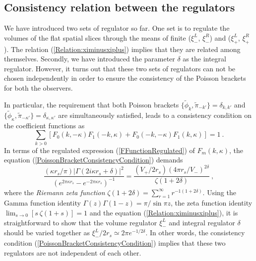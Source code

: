 \documentclass[aps,twocolumn,showpacs]{revtex4}
\def\kr{\kappa}
\def\rs{r_s}
\begin{document}
\subsection{Consistency relation between the regulators}          

We have introduced two sets of regulator so far. One set is to regulate the 
volumes of the flat spatial slices through the means of finite ($\xi_{-}^L$, 
$\xi_{-}^R$) and ($\xi_{+}^L$, $\xi_{+}^R$). The relation 
(\ref{Relation:ximinusxiplus}) implies that they are related among 
themselves. Secondly, we have introduced the parameter $\delta$ as the integral 
regulator. However, it turns out that these two sets of regulators can not be 
chosen independently in order to ensure the consistency of the Poisson brackets 
for both the observers. 
        

In particular, the requirement that both Poisson brackets 
$\{\tilde{\phi}_{k},\tilde{\pi}_{-k'}\} = \delta_{k,k'}$ and
$\{\tilde{\phi}_{\kr},\tilde{\pi}_{-\kr'}\} = \delta_{\kr,\kr'}$
are simultaneously satisfied, leads to a consistency condition on the
coefficient functions as
%
\begin{equation}\label{PoissonBracketConsistencyCondition}
\sum_{k>0} \left[ F_{0}(k,-\kr)F_{1}(-k,\kr) 
+ F_{0}(-k,-\kr)F_{1}(k,\kr) \right] = 1 ~.
\end{equation}
%
In terms of the regulated expression (\ref{FFunctionRegulated}) of 
$F_{m}(k,\kr)$, the  equation (\ref{PoissonBracketConsistencyCondition}) demands
%
\begin{equation}\label{PoissonBracketConsistencyCondition2}
\frac{(\kr\rs/\pi) |\Gamma(2i\kr\rs + \delta)|^2}
{(e^{2\pi\kr\rs}-e^{-2\pi\kr\rs})^{-1}}
= \frac{(V_{+}/2\rs) (4\pi\rs/V_{-})^{2\delta} }{\zeta(1+2\delta)} ~,
\end{equation}
%
where the \emph{Riemann zeta function} $\zeta(1+2\delta) = \sum_{r=1}^{\infty} 
r^{-1(1+2\delta)}$. Using the Gamma function identity 
$\Gamma(z)\Gamma(1-z) = \pi/\sin\pi z$, the zeta function identity 
$\lim_{s\to0}[s~ \zeta(1+s)] = 1$ and the equation 
(\ref{Relation:ximinusxiplus}), it is straightforward to show that 
the volume regulator $\xi_{-}^L$ and integral regulator $\delta$ should be
varied together as $\xi_{-}^L/2\rs \simeq 2\pi e^{-1/2\delta}$. In other words,
the consistency condition (\ref{PoissonBracketConsistencyCondition}) implies
that these two regulators are not independent of each other.
\end{document}

